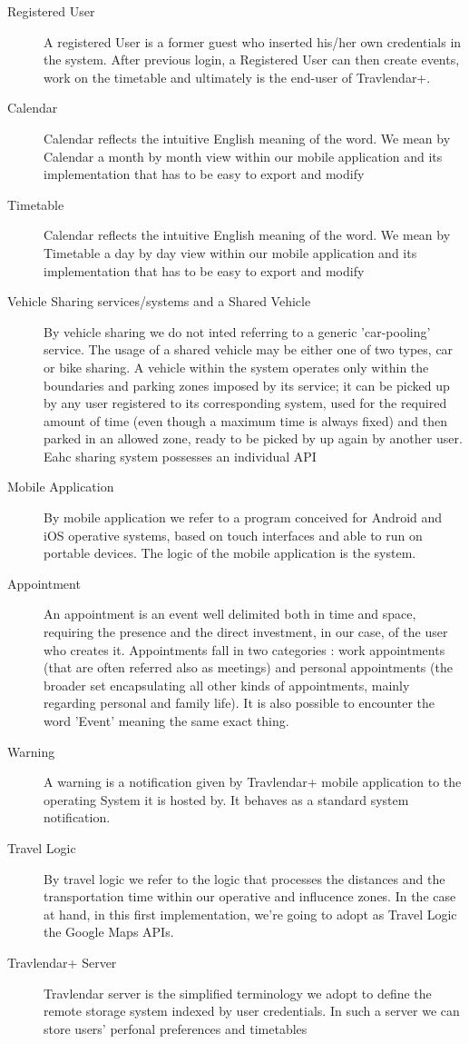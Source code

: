 \begin{description}
				\item[Registered User] A registered User is a former guest who inserted his/her own credentials in the system. After previous login, a Registered User can then create events, work on the timetable and ultimately is the end-user of Travlendar+.
				\item[Calendar] Calendar reflects the intuitive English meaning of the word. We mean by Calendar a month by month view within our mobile application and its implementation that has to be easy to export and modify
			       	\item[Timetable] Calendar reflects the intuitive English meaning of the word. We mean by Timetable a day by day view within our mobile application and its implementation that has to be easy to export and modify
				\item[Vehicle Sharing services/systems and a Shared Vehicle] By vehicle sharing we do not inted referring to a generic 'car-pooling' service. The usage of a shared vehicle may be either one of two types, car or bike sharing. A vehicle within the system operates only within the boundaries and parking zones imposed by its service; it can be picked up by any user registered to its corresponding system, used for the required amount of time (even though a maximum time is always fixed) and then parked in an allowed zone, ready to be picked by up again by another user. Eahc sharing system possesses an individual API			
				\item[Mobile Application] By mobile application we refer to a program conceived for Android and iOS operative systems, based on touch interfaces and able to run on portable devices. The logic of the mobile application is the system.
				\item[Appointment\Event] An appointment is an event well delimited both in time and space, requiring the presence and the direct investment, in our case, of the user who creates it. Appointments fall in two categories : work appointments (that are often referred also as meetings) and personal appointments (the broader set encapsulating all other kinds of appointments, mainly regarding personal and family life). It is also possible to encounter the word 'Event' meaning the same exact thing.
				\item[Warning] A warning is a notification given by Travlendar+ mobile application to the operating System it is hosted by. It behaves as a standard system notification.
				\item[Travel Logic] By travel logic we refer to the logic that processes the distances and the transportation time within our operative and influcence zones. In the case at hand, in this first implementation, we're going to adopt as Travel Logic the Google Maps APIs.
				\item [Travlendar+ Server] Travlendar server is the simplified terminology we adopt to define the remote storage system indexed by user credentials. In such a server we can store users' perfonal preferences and timetables  
\end{description}
